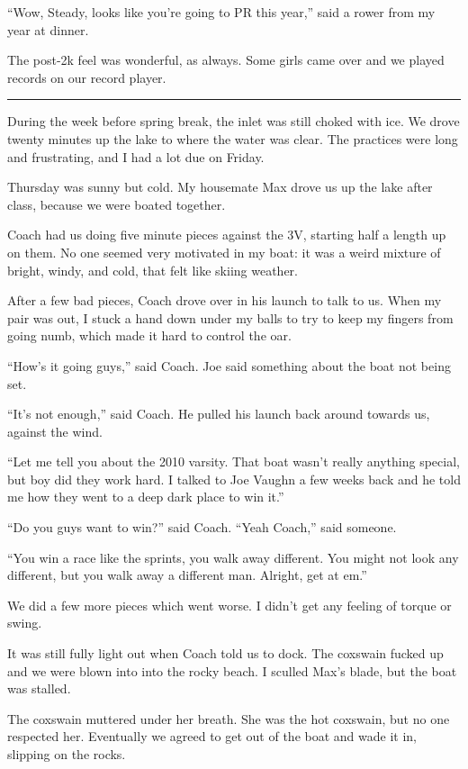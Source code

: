 ``Wow, Steady, looks like you're going to PR this year,'' said a rower from my
year at dinner.  

The post-2k feel was wonderful, as always.  Some girls came over and we played
records on our record player.  

\plainfancybreak{12pt}{2}{* * *}

During the week before spring break, the inlet was still choked with ice. We
drove twenty minutes up the lake to where the water was clear.  The practices
were long and frustrating, and I had a lot due on Friday.

Thursday was sunny but cold.  My housemate Max drove us up the lake after
class, because we were boated together. 

Coach had us doing five minute pieces against the 3V, starting half a
length up on them.  No one seemed very motivated in my boat: it was a weird
mixture of bright, windy, and cold, that felt like skiing weather.

After a few bad pieces, Coach drove over in his launch to talk to us.  When my
pair was out, I stuck a hand down under my balls to try to keep my fingers from
going numb, which made it hard to control the oar.

``How's it going guys,'' said Coach.  Joe said something about the boat not
being set.

``It's not enough,'' said Coach.  He pulled his launch back around towards us,
against the wind.

``Let me tell you about the 2010 varsity.  That boat wasn't really anything
special, but boy did they work hard.  I talked to Joe Vaughn a few weeks back
and he told me how they went to a deep dark place to win it.''

``Do you guys want to win?'' said Coach.  ``Yeah Coach,'' said someone.

``You win a race like the sprints, you walk away different.  You might not look
any different, but you walk away a different man.  Alright, get at em.''

We did a few more pieces which went worse.  I didn't get any feeling of torque
or swing.  

It was still fully light out when Coach told us to dock.  The coxswain fucked up
and we were blown into into the rocky beach.  I sculled Max's blade, but the
boat was stalled.

The coxswain muttered under her breath.  She was the hot coxswain, but no one
respected her.  Eventually we agreed to get out of the boat and wade it in,
slipping on the rocks.

